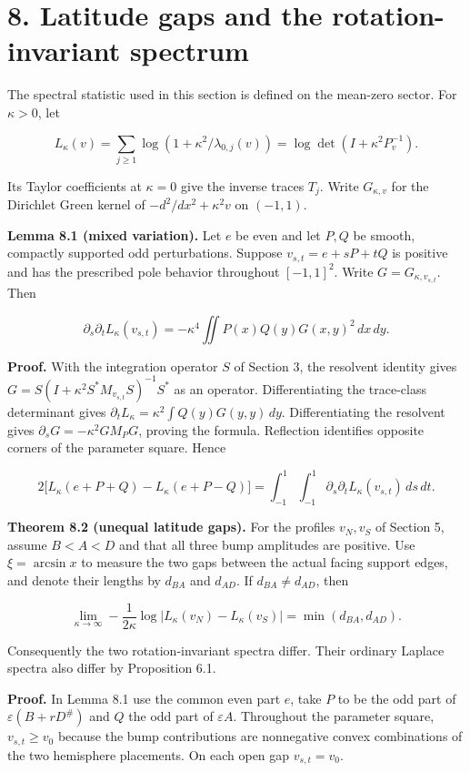 \documentclass[11pt,letterpaper]{article}
\begin{document}
\section{8. Latitude gaps and the rotation-invariant
spectrum}\label{latitude-gaps-and-the-rotation-invariant-spectrum}

The spectral statistic used in this section is defined on the mean-zero sector. For
\(\kappa>0\), let

\[L_\kappa(v)=\sum_{j\ge1}\log(1+\kappa^2/\lambda_{0,j}(v))=\log\det(I+\kappa^2P_v^{-1}).\]

Its Taylor coefficients at \(\kappa=0\) give the inverse traces \(T_j\). Write
\(G_{\kappa,v}\) for the Dirichlet Green kernel of \(-d^2/dx^2+\kappa^2v\) on \((-1,1)\).

\textbf{Lemma 8.1 (mixed variation).} Let \(e\) be even and let \(P,Q\) be smooth, compactly
supported odd perturbations. Suppose \(v_{s,t}=e+sP+tQ\) is positive and has the prescribed
pole behavior throughout \([-1,1]^2\). Write \(G=G_{\kappa,v_{s,t}}\). Then

\[\partial_s\partial_t L_\kappa(v_{s,t})=-\kappa^4\iint P(x)Q(y)G(x,y)^2\,dx\,dy.\]

\textbf{Proof.} With the integration operator \(S\) of Section 3, the resolvent identity
gives \(G=S(I+\kappa^2S^*M_{v_{s,t}}S)^{-1}S^*\) as an operator. Differentiating the
trace-class determinant gives \(\partial_tL_\kappa=\kappa^2\int Q(y)G(y,y)\,dy\).
Differentiating the resolvent gives \(\partial_s G=-\kappa^2 G M_P G\), proving the formula.
Reflection identifies opposite corners of the parameter square. Hence

\[2\big[L_\kappa(e+P+Q)-L_\kappa(e+P-Q)\big]=\int_{-1}^1\int_{-1}^1\partial_s\partial_t L_\kappa(v_{s,t})\,ds\,dt.\]

\textbf{Theorem 8.2 (unequal latitude gaps).} For the profiles \(v_N,v_S\) of Section 5,
assume \(B<A<D\) and that all three bump amplitudes are positive. Use \(\xi=\arcsin x\) to
measure the two gaps between the actual facing support edges, and denote their lengths by
\(d_{BA}\) and \(d_{AD}\). If \(d_{BA}\ne d_{AD}\), then

\[\lim_{\kappa\to\infty}-\frac{1}{2\kappa}\log\big|L_\kappa(v_N)-L_\kappa(v_S)\big|=\min(d_{BA},d_{AD}).\]

Consequently the two rotation-invariant spectra differ. Their ordinary Laplace spectra also
differ by Proposition 6.1.

\textbf{Proof.} In Lemma 8.1 use the common even part \(e\), take \(P\) to be the odd part
of \(\varepsilon(B+rD^\#)\) and \(Q\) the odd part of \(\varepsilon A\). Throughout the
parameter square, \(v_{s,t}\ge v_0\) because the bump contributions are nonnegative convex
combinations of the two hemisphere placements. On each open gap \(v_{s,t}=v_0\).
\end{document}
